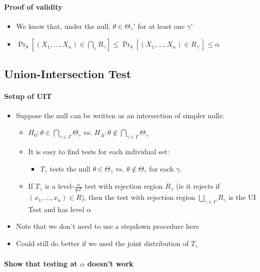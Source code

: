 \paragraph{Proof of validity}
\begin{itemize}
\item We know that, under the null, $\theta \in \Theta_\gamma'$ for at least one $\gamma'$
\item $\Pr_\theta[(X_1,\dots,X_n) \in \bigcap_\gamma R_\gamma] \leq \Pr_\theta[(X_1,\dots, X_n) \in R_{\gamma'}] \leq \alpha$
\end{itemize}

\subsection{Union-Intersection Test}

\paragraph{Setup of UIT}
\begin{itemize}
\item Suppose the null can be written as an intersection of simpler nulls:
\begin{itemize}
\item $H_0: \theta \in \bigcap_{\gamma \in \Gamma} \Theta_\gamma$ vs. 
         $H_A: \theta \notin \bigcap_{\gamma \in \Gamma} \Theta_\gamma$
\item It is easy to find tests for each individual set:
\begin{itemize}
\item $T_\gamma$ tests the null $\theta \in \Theta_\gamma$
           vs. $\theta \notin \Theta_\gamma$ for each $\gamma$.
\end{itemize}
\item If $T_\gamma$ is a level-$\frac{\alpha}{\# \Gamma}$ test with
         rejection region $R_\gamma$ (ie it rejects if
         $(x_1,\dots,x_n) \in R$), then the test with rejection region
         $\bigcup_{\gamma \in \Gamma} R_\gamma$ is the UI Test and has
         level $\alpha$
\end{itemize}
\item Note that we don't need to use a stepdown procedure here
\item Could still do better if we used the joint distribution of $T_\gamma$
\end{itemize}

\paragraph{Show that testing at $\alpha$ doesn't work}

